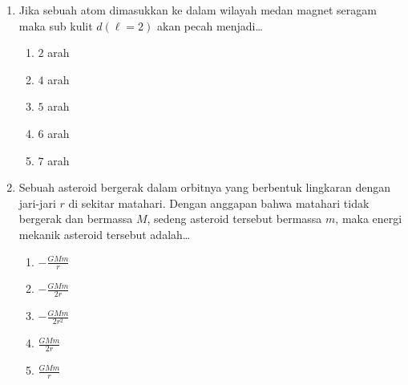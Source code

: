 \documentclass[A4,12PT, english, twocolumn]{journal}
\begin{document}
\begin{enumerate}
\item Jika sebuah atom dimasukkan ke dalam wilayah medan magnet seragam maka sub kulit $d(\ell=2)$ akan pecah menjadi\dots
    \begin{enumerate}
        \item $2$ arah
        \item $4$ arah
        \item $5$ arah
        \item $6$ arah
        \item $7$ arah
    \end{enumerate}

\item Sebuah asteroid bergerak dalam orbitnya yang berbentuk lingkaran dengan jari-jari $r$ di sekitar matahari. Dengan anggapan bahwa matahari tidak bergerak dan bermassa $M$, sedeng asteroid tersebut bermassa $m$, maka energi mekanik asteroid tersebut adalah\dots
    \begin{enumerate}
        \item $-\frac{GMm}{r}$
        \item $-\frac{GMm}{2r}$
        \item $-\frac{GMm}{2r^2}$
        \item $\frac{GMm}{2r}$
        \item $\frac{GMm}{r}$
    \end{enumerate}

\end{enumerate}
\end{document}
